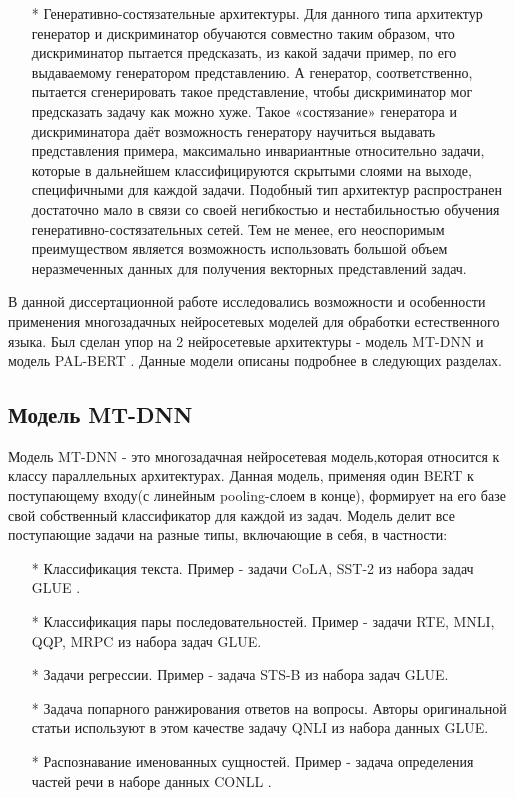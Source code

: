 \begin{itemize}
\item[*] Генеративно-состязательные архитектуры. Для данного типа архитектур генератор и дискриминатор обучаются совместно таким образом, что дискриминатор пытается предсказать, из какой задачи пример, по его выдаваемому генератором представлению. А генератор, соответственно, пытается сгенерировать такое представление, чтобы дискриминатор мог предсказать задачу как можно хуже. Такое «состязание» генератора и дискриминатора даёт возможность генератору научиться выдавать представления примера, максимально инвариантные относительно задачи, которые в дальнейшем классифицируются скрытыми слоями на выходе, специфичными для каждой задачи. Подобный тип архитектур распространен достаточно мало в связи со своей негибкостью и нестабильностью обучения генеративно-состязательных сетей. Тем не менее, его неоспоримым преимуществом является возможность использовать большой объем неразмеченных данных для получения векторных представлений задач. 
\end{itemize}

В данной диссертационной работе исследовались возможности и особенности применения многозадачных нейросетевых моделей для обработки естественного языка. Был сделан упор на 2 нейросетевые архитектуры - модель MT-DNN \cite{mtdnn} и модель PAL-BERT \cite{stickland_2019}. Данные модели описаны подробнее в следующих разделах.

\subsection{Модель MT-DNN}\label{ch:mtl:mtdnn}
Модель MT-DNN - это многозадачная нейросетевая модель,которая относится к классу параллельных архитектурах. Данная модель, применяя один BERT к поступающему входу(с линейным pooling-слоем в конце), формирует на его базе свой собственный классификатор для каждой из задач. Модель делит все поступающие задачи на разные типы, включающие в себя, в частности:
\begin{itemize}
\item[*] Классификация текста. Пример - задачи CoLA, SST-2 из набора задач GLUE \cite{wang_2018}.
\item[*] Классификация пары последовательностей. Пример - задачи RTE, MNLI, QQP, MRPC из набора задач GLUE. 
\item[*] Задачи регрессии. Пример - задача STS-B из набора задач GLUE. 
\item[*] Задача попарного ранжирования ответов на вопросы. Авторы оригинальной статьи используют в этом качестве задачу QNLI из набора данных GLUE.
\item[*] Распознавание именованных сущностей. Пример - задача определения частей речи в наборе данных CONLL \cite{sang_2003}. 
\end{itemize}


